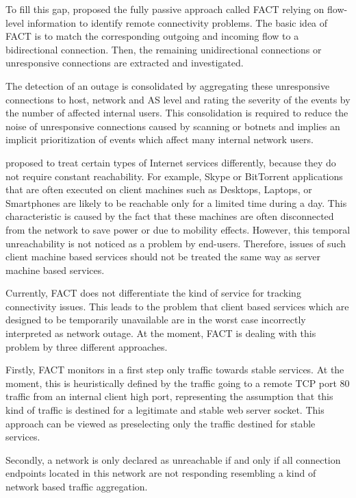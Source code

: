 To fill this gap, \citet{SchatzmannPAM2011} proposed the fully passive approach 
called \gls{FACT} relying on flow-level information to identify remote 
connectivity problems. The basic idea of \gls{FACT} is to match 
the corresponding outgoing and incoming flow to a bidirectional connection. 
Then, the remaining unidirectional connections or unresponsive connections are 
extracted and investigated. 

The detection of an outage is consolidated by aggregating these unresponsive 
connections to host, network and \gls{AS} level and rating the severity of the 
events by the number of affected internal users. This consolidation is required 
to reduce the noise of unresponsive connections caused by scanning or botnets 
and implies an implicit prioritization of events which affect many internal 
network users.

\citet{SchatzmanThesis2012} proposed to treat certain types of Internet
services differently, because they do not require constant reachability. For
example, Skype or BitTorrent applications that are often executed on client
machines such as Desktops, Laptops, or Smartphones are likely to be reachable
only for a limited time during a day.
This characteristic is caused by the fact that these machines are often
disconnected from the network to save power or due to mobility effects. However, 
this temporal unreachability is not noticed as a problem by end-users. 
Therefore, issues of such client machine based services should not be treated 
the same way as server machine based services.

Currently, \gls{FACT} does not differentiate the kind of service for tracking 
connectivity issues. This leads to the problem that client based services which 
are designed to be temporarily unavailable are in the worst case incorrectly 
interpreted as network outage. 
At the moment, \gls{FACT} is dealing with this problem by three different 
approaches. 

Firstly, \gls{FACT} monitors in a first step only traffic towards stable 
services. At the moment, this is heuristically defined by the traffic going to a 
remote \gls{TCP} port 80 traffic from an internal client high port, representing 
the assumption that this kind of traffic is destined for a legitimate and stable 
web server socket. This approach can be viewed as preselecting only the traffic 
destined for stable services.  

Secondly, a network is only declared as unreachable if and only if all 
connection endpoints located in this network are not responding resembling a 
kind of network based traffic aggregation. 

